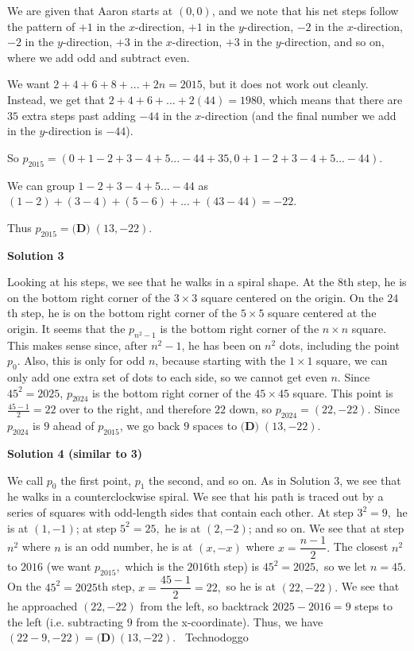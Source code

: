 \begin{enumerate}
We are given that Aaron starts at $(0, 0)$, and we note that his net steps follow the pattern of $+1$ in the $x$-direction, $+1$ in the $y$-direction, $-2$ in the $x$-direction, $-2$ in the $y$-direction, $+3$ in the $x$-direction, $+3$ in the $y$-direction, and so on, where we add odd and subtract even.

 We want $2 + 4 + 6 + 8 + ... + 2n = 2015$, but it does not work out cleanly. Instead, we get that $2 + 4 + 6 + ... + 2(44) = 1980$, which means that there are $35$ extra steps past adding $-44$ in the $x$-direction (and the final number we add in the $y$-direction is $-44$).

 So $p_{2015} = (0+1-2+3-4+5...-44+35, 0+1-2+3-4+5...-44)$.

 We can group $1-2+3-4+5...-44$ as $(1-2)+(3-4)+(5-6)+...+(43-44) = -22$.

 Thus $p_{2015} = \boxed{\textbf{(D)}\; (13, -22)}$.

 



\textbf{Solution 3}

Looking at his steps, we see that he walks in a spiral shape. At the $8$th step, he is on the bottom right corner of the $3\times 3$ square centered on the origin. On the $24$th step, he is on the bottom right corner of the $5\times 5$ square centered at the origin. It seems that the $p_{n^2-1}$ is the bottom right corner of the $n\times n$ square. This makes sense since, after $n^2-1$, he has been on $n^2$ dots, including the point $p_0$. Also, this is only for odd $n$, because starting with the $1\times 1$ square, we can only add one extra set of dots to each side, so we cannot get even $n$. Since $45^2=2025$, $p_{2024}$ is the bottom right corner of the $45\times 45$ square. This point is $\frac{45-1}{2}=22$ over to the right, and therefore $22$ down, so $p_{2024}=(22, -22)$. Since $p_{2024}$ is $9$ ahead of $p_{2015}$, we go back $9$ spaces to $\boxed{\textbf{(D)}\; (13, -22)}$.

 



\textbf{Solution 4 (similar to 3)}

We call $p_0$ the first point, $p_1$ the second, and so on. As in Solution 3, we see that he walks in a counterclockwise spiral. We see that his path is traced out by a series of squares with odd-length sides that contain each other. At step $3^2=9,$ he is at $(1,-1)$; at step $5^2=25,$ he is at $(2,-2)$; and so on. We see that at step $n^2$ where $n$ is an odd number, he is at $(x,-x)$ where $x=\dfrac{n-1}2.$ The closest $n^2$ to $2016$ (we want $p_{2015},$ which is the $2016$th step) is $45^2=2025,$ so we let $n=45.$ On the $45^2=2025$th step, $x=\dfrac{45-1}2=22,$ so he is at $(22,-22).$ We see that he approached $(22,-22)$ from the left, so backtrack $2025-2016=9$ steps to the left (i.e. subtracting $9$ from the x-coordinate). Thus, we have $(22-9,-22)=\boxed{\textbf{(D)}~(13,-22).}$ ~Technodoggo


\end{enumerate}
